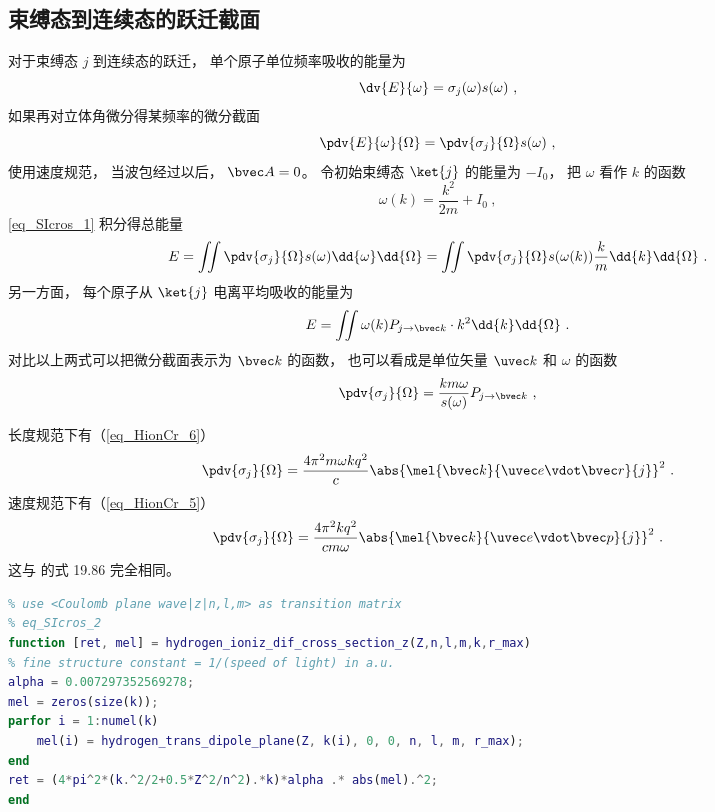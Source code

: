 \subsection{束缚态到连续态的跃迁截面}
对于束缚态 $j$ 到连续态的跃迁， 单个原子单位频率吸收的能量为
\begin{equation}
\dv{E}{\omega} = \sigma_j(\omega) s(\omega)~,
\end{equation}
如果再对立体角微分得某频率的微分截面 %
\begin{equation}\label{eq_SIcros_1}
\pdv{E}{\omega}{\Omega} = \pdv{\sigma_j}{\Omega} s(\omega)~,
\end{equation}
使用速度规范， 当波包经过以后， $\bvec A = 0$。 令初始束缚态 $\ket{j}$ 的能量为 $-I_0$， 把 $\omega$ 看作 $k$ 的函数
\begin{equation}
\omega(k) = \frac{k^2}{2m} + I_0~,
\end{equation}
\autoref{eq_SIcros_1} 积分得总能量
\begin{equation}
E = \iint \pdv{\sigma_j}{\Omega} s(\omega) \dd{\omega}\dd{\Omega} = \iint \pdv{\sigma_j}{\Omega} s(\omega(k)) \frac{k}{m}\dd{k}\dd{\Omega}~.
\end{equation}
另一方面， 每个原子从 $\ket{j}$ 电离平均吸收的能量为
\begin{equation}
E = \iint \omega(k) P_{j\to {\bvec k}} \cdot k^2 \dd{k}\dd{\Omega}~.
\end{equation}
对比以上两式可以把微分截面表示为 $\bvec k$ 的函数， 也可以看成是单位矢量 $\uvec k$ 和 $\omega$ 的函数
\begin{equation}
\pdv{\sigma_j}{\Omega} = \frac{km \omega}{s(\omega)} P_{j\to \bvec k}~,
\end{equation}

长度规范下有（\autoref{eq_HionCr_6}）
\begin{equation}\label{eq_SIcros_2}
\pdv{\sigma_j}{\Omega} = \frac{4\pi^2 m\omega k q^2}{c} \abs{\mel{\bvec k}{\uvec e \vdot\bvec r}{j}}^2~.
\end{equation}
速度规范下有（\autoref{eq_HionCr_5}）
\begin{equation}\label{eq_SIcros_8}
\pdv{\sigma_j}{\Omega} = \frac{4\pi^2 k q^2}{c m \omega} \abs{\mel{\bvec k}{\uvec e \vdot \bvec p}{j}}^2~.
\end{equation}
这与 \cite{Merzbacher} 的式 19.86 完全相同。

\begin{lstlisting}[language=matlab, caption=hydrogen\_ioniz\_dif\_cross\_section\_z.m]
% hydrogen single ionization differential cross section
% use <Coulomb plane wave|z|n,l,m> as transition matrix
% eq_SIcros_2
function [ret, mel] = hydrogen_ioniz_dif_cross_section_z(Z,n,l,m,k,r_max)
% fine structure constant = 1/(speed of light) in a.u.
alpha = 0.007297352569278;
mel = zeros(size(k));
parfor i = 1:numel(k)
    mel(i) = hydrogen_trans_dipole_plane(Z, k(i), 0, 0, n, l, m, r_max);
end
ret = (4*pi^2*(k.^2/2+0.5*Z^2/n^2).*k)*alpha .* abs(mel).^2;
end
\end{lstlisting}


